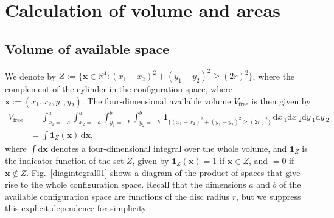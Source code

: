 \documentclass[superscriptaddress,pre,reprint,showpacs,twocolumn]{revtex4-1}
\newcommand{\rd}[1]{\mathrm{d}{#1} \,}
\newcommand{\indicatorsymbol}{\mathbf{1}}
\newcommand{\indicator}[1]{\indicatorsymbol_{ \{   #1 \} } }
\begin{document}
\section{Calculation of volume and areas}


\subsection{Volume of available space}


We denote by $Z := \{ \mathbf{x} \in \mathbb{R}^4: (x_1-x_2)^2 + (y_1-y_2)^2 \ge (2r)^2 \}$, where
the complement of the cylinder in the configuration space, where $\mathbf{x} := (x_1, x_2, y_1, y_2)$.
The four-dimensional available volume $V_\text{free}$ is then given by
\begin{align}\label{volindic}
V_\text{free} &= 
\int_{x_1 = -a}^a  \int_{x_2 = -a}^a  \int_{y_1 = -b}^b \int_{y_2 = -b}^b
 \, \indicator{ (x_1-x_2)^2 + (y_1-y_2)^2 \ge (2r)^2 } \,
\rd x_1 \rd x_2 \rd y_1 \rd y_2 \\
&=
\int \indicatorsymbol_Z(\mathbf{x}) \, \mathrm{d} \mathbf{x},
\end{align}
where $\int  \mathrm{d} \mathbf{x}$
denotes a four-dimensional integral over the whole volume, and 
$\indicatorsymbol_Z$ is the indicator function of the set $Z$, 
given by $\indicatorsymbol_Z (\mathbf{x}) = 1$ if $\mathbf{x} \in Z$, and $=0$ if $\mathbf{x} \notin Z$.
Fig.~\ref{diagintegral01} shows a diagram of the product of
spaces that give rise to the whole configuration space.
Recall that the dimensions $a$ and $b$ of the available configuration space are functions of the disc radius $r$, 
but we suppress this explicit dependence for simplicity.
\end{document}
